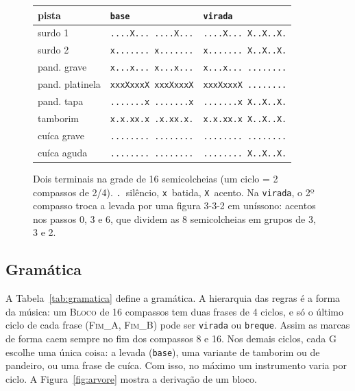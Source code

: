 \documentclass{article}
\newcommand{\nt}[1]{\textsc{#1}}      %
\newcommand{\tm}[1]{\texttt{#1}}      %
\begin{document}
\begin{figure}[t]
  \centering
  \footnotesize
  \begin{tabular}{@{}lll@{}}
    \toprule
    pista            & \tm{base}                        & \tm{virada} \\
    \midrule
    surdo 1          & \texttt{....X...\,....X...} & \texttt{....X...\,X..X..X.} \\
    surdo 2          & \texttt{x.......\,x.......} & \texttt{x.......\,X..X..X.} \\
    pand. grave      & \texttt{x...x...\,x...x...} & \texttt{x...x...\,........} \\
    pand. platinela  & \texttt{xxxXxxxX\,xxxXxxxX} & \texttt{xxxXxxxX\,........} \\
    pand. tapa       & \texttt{.......x\,.......x} & \texttt{.......x\,X..X..X.} \\
    tamborim         & \texttt{x.x.xx.x\,.x.xx.x.} & \texttt{x.x.xx.x\,X..X..X.} \\
    cuíca grave      & \texttt{........\,........} & \texttt{........\,........} \\
    cuíca aguda      & \texttt{........\,........} & \texttt{........\,X..X..X.} \\
    \bottomrule
  \end{tabular}
  \caption{Dois terminais na grade de 16 semicolcheias (um ciclo = 2 compassos de 2/4).
  \texttt{.}~silêncio, \texttt{x}~batida, \texttt{X}~acento. Na \tm{virada}, o 2º compasso
  troca a levada por uma figura 3-3-2 em uníssono: acentos nos passos 0, 3 e 6, que dividem
  as 8 semicolcheias em grupos de 3, 3 e 2.}
  \label{fig:grade}
\end{figure}

\subsection{Gramática}\label{sec:gramatica}

A Tabela~\ref{tab:gramatica} define a gramática. A hierarquia das regras é a forma da música: um \nt{Bloco} de 16 compassos tem duas
frases de 4 ciclos, e só o último ciclo de cada frase (\nt{Fim\_A}, \nt{Fim\_B}) pode ser
\tm{virada} ou \tm{breque}. Assim as marcas de forma caem sempre no fim dos compassos 8 e 16.
Nos demais ciclos, cada \nt{G} escolhe uma única coisa: a levada (\tm{base}), uma variante de
tamborim ou de pandeiro, ou uma frase de cuíca. Com isso, no máximo um instrumento varia por
ciclo. A Figura~\ref{fig:arvore} mostra a derivação de um bloco.
\end{document}
